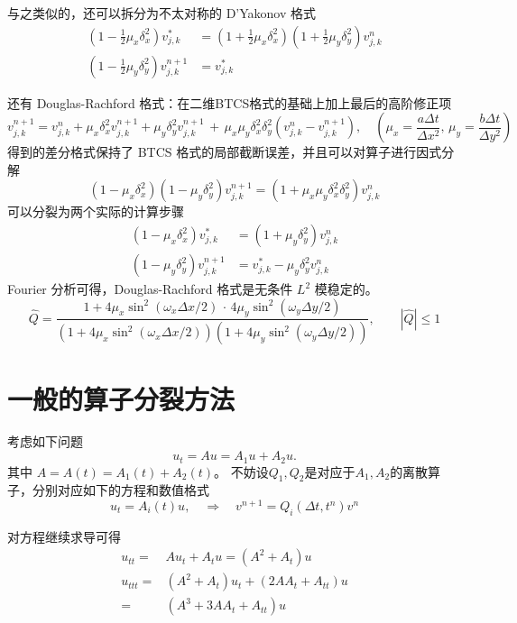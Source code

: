 \begin{remark}
    与之类似的，还可以拆分为不太对称的 D'Yakonov 格式
    \begin{align*}
        \left(1-\frac12 \mu_x \delta_x^2 \right) v_{j,k}^{*}   & =\left(1+\frac12 \mu_x \delta_x^2\right) \left(1+\frac12  \mu_y \delta_y^2\right)v_{j,k}^{n} \\
        \left(1-\frac12 \mu_y \delta_y^2 \right) v_{j,k}^{n+1} & = v_{j,k}^{*}
    \end{align*}
\end{remark}


还有 Douglas-Rachford 格式：在二维BTCS格式的基础上加上最后的高阶修正项
\[
    v_{j,k}^{n+1} = v_{j,k}^n
    + \mu_x \delta_x^2 v_{j,k}^{n+1}
    + \mu_y \delta_y^2 v_{j,k}^{n+1}
    \,+\, \mu_x \mu_y \delta_x^2 \delta_y^2(v_{j,k}^{n} - v_{j,k}^{n+1}),\quad (\mu_x = \frac{a \Delta t}{\Delta x^2},\,\mu_y = \frac{b \Delta t}{\Delta y^2})
\]
得到的差分格式保持了 BTCS 格式的局部截断误差，并且可以对算子进行因式分解
\[
    \left(1- \mu_x \delta_x^2 \right)\left(1- \mu_y \delta_y^2 \right) v_{j,k}^{n+1}=
    \left(1+ \mu_x \mu_y \delta_x^2 \delta_y^2\right) v_{j,k}^n
\]
可以分裂为两个实际的计算步骤
\begin{align*}
    \left(1- \mu_x \delta_x^2 \right) v_{j,k}^{*}   & =\left(1+ \mu_y \delta_y^2\right) v_{j,k}^{n} \\
    \left(1- \mu_y \delta_y^2 \right) v_{j,k}^{n+1} & = v_{j,k}^{*} - \mu_y \delta_y^2 v_{j,k}^n
\end{align*}
Fourier 分析可得，Douglas-Rachford 格式是无条件 $L^2$ 模稳定的。
\[
    \widehat{Q} =
    \frac{1 + 4 \mu_x \sin^2(\omega_x \Delta x/2)\,\cdot\,4 \mu_y \sin^2(\omega_y \Delta y/2)}{(1 + 4 \mu_x \sin^2(\omega_x \Delta x/2))(1 + 4 \mu_y \sin^2(\omega_y \Delta y/2))},\qquad
    |\widehat{Q}| \le 1
\]


\section{一般的算子分裂方法}

考虑如下问题
\[
    u_t = A u = A_1 u + A_2 u.
\]
其中 $A = A(t) = A_1(t) + A_2(t)$。
不妨设$Q_1,Q_2$是对应于$A_1,A_2$的离散算子，分别对应如下的方程和数值格式
\[
    u_t = A_i(t) u ,\quad \Rightarrow\quad v^{n+1} = Q_i(\Delta t,t^n) v^n
\]

对方程继续求导可得
\begin{align*}
    u_{tt} ={}  & A u_t + A_{t} u = (A^2 + A_{t}) u       \\
    u_{ttt} ={} & (A^2 + A_{t}) u_t + (2A A_t + A_{tt}) u \\
    ={}         & (A^3 + 3A A_t + A_{tt}) u
\end{align*}


